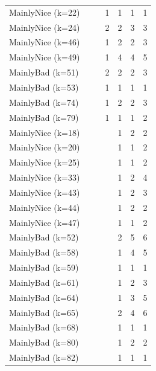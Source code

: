 \documentclass[journal,10pt,twoside]{IEEEtran}
\begin{document}
\begin{table}[ht]
\begin{tabular}{l|cccccc}
        MainlyNice (k=22)    &     &     &    1 &    1 &    1 &    1 \\
        MainlyNice (k=24)    &     &     &    2 &    2 &    3 &    3 \\
        MainlyNice (k=46)    &     &     &    1 &    2 &    2 &    3 \\
        MainlyNice (k=49)    &     &     &    1 &    4 &    4 &    5 \\
        MainlyBad (k=51)     &     &     &    2 &    2 &    2 &    3 \\
        MainlyBad (k=53)     &     &     &    1 &    1 &    1 &    1 \\
        MainlyBad (k=74)     &     &     &    1 &    2 &    2 &    3 \\
        MainlyBad (k=79)     &     &     &    1 &    1 &    1 &    2 \\%
        MainlyNice (k=18)    &     &     &      &    1 &    2 &    2 \\
        MainlyNice (k=20)    &     &     &      &    1 &    1 &    2 \\
        MainlyNice (k=25)    &     &     &      &    1 &    1 &    2 \\
        MainlyNice (k=33)    &     &     &      &    1 &    2 &    4 \\
        MainlyNice (k=43)    &     &     &      &    1 &    2 &    3 \\
        MainlyNice (k=44)    &     &     &      &    1 &    2 &    2 \\
        MainlyNice (k=47)    &     &     &      &    1 &    1 &    2 \\
        MainlyBad (k=52)     &     &     &      &    2 &    5 &    6 \\
        MainlyBad (k=58)     &     &     &      &    1 &    4 &    5 \\
        MainlyBad (k=59)     &     &     &      &    1 &    1 &    1 \\
        MainlyBad (k=61)     &     &     &      &    1 &    2 &    3 \\
        MainlyBad (k=64)     &     &     &      &    1 &    3 &    5 \\
        MainlyBad (k=65)     &     &     &      &    2 &    4 &    6 \\
        MainlyBad (k=68)     &     &     &      &    1 &    1 &    1 \\
        MainlyBad (k=80)     &     &     &      &    1 &    2 &    2 \\
        MainlyBad (k=82)     &     &     &      &    1 &    1 &    1 \\%

\end{tabular}
\end{table}
\end{document}
